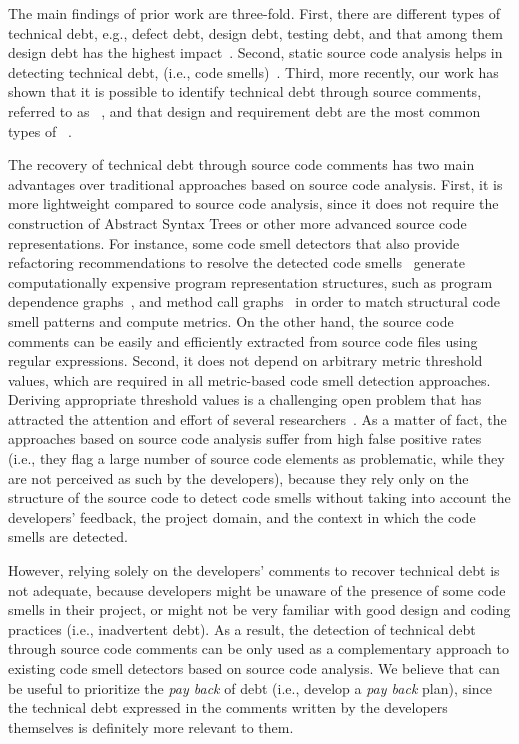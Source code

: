 The main findings of prior work are three-fold. First, there are different types of technical debt, e.g., defect debt, design debt, testing debt, and that among them design debt has the highest impact~\cite{Alves2014MTD,Marinescu2012IBM}. Second, static source code analysis helps in detecting technical debt, (i.e., code smells)~\cite{Marinescu2004ICSM,Marinescu2010CSMR,Zazworka2013CSE}. Third, more recently, our work has shown that it is possible to identify technical debt through source comments, referred to as  \SATD~\cite{Potdar2014ICSME}, and that design and requirement debt are the most common types of \SATD~\cite{Maldonado2015MTD}.

The recovery of technical debt through source code comments has two main advantages over traditional approaches based on source code analysis. First, it is more lightweight compared to source code analysis, since it does not require the construction of Abstract Syntax Trees or other more advanced source code representations. For instance, some code smell detectors that also provide refactoring recommendations to resolve the detected code smells~\cite{Tsantalis2011TSE,Tsantalis2015TSE} generate computationally expensive program representation structures, such as program dependence graphs~\cite{Graf2010SCAM}, and method call graphs~\cite{Ali2012ECOOP} in order to match structural code smell patterns and compute metrics. On the other hand, the source code comments can be easily and efficiently extracted from source code files using regular expressions. Second, it does not depend on arbitrary metric threshold values, which are required in all metric-based code smell detection approaches. Deriving appropriate threshold values is a challenging open problem that has attracted the attention and effort of several researchers~\cite{Oliveira2014CSMR,Fontana2015WETSoM,Fontana2015EMSE}. As a matter of fact, the approaches based on source code analysis suffer from high false positive rates~\cite{Fontana2016SANER} (i.e., they flag a large number of source code elements as problematic, while they are not perceived as such by the developers), because they rely only on the structure of the source code to detect code smells without taking into account the developers' feedback, the project domain, and the context in which the code smells are detected.

However, relying solely on the developers' comments to recover technical debt is not adequate, because developers might be unaware of the presence of some code smells in their project, or might not be very familiar with good design and coding practices (i.e., inadvertent debt).
As a result, the detection of technical debt through source code comments can be only used as a complementary approach to existing code smell detectors based on source code analysis.
We believe that \SATD can be useful to prioritize the \textit{pay back} of debt (i.e., develop a \textit{pay back} plan), since the technical debt expressed in the comments written by the developers themselves is definitely more relevant to them.

